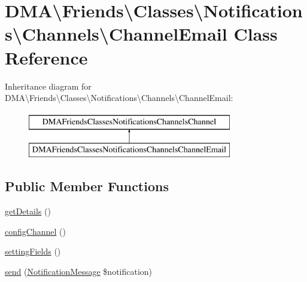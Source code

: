 \hypertarget{classDMA_1_1Friends_1_1Classes_1_1Notifications_1_1Channels_1_1ChannelEmail}{}\section{D\+M\+A\textbackslash{}Friends\textbackslash{}Classes\textbackslash{}Notifications\textbackslash{}Channels\textbackslash{}Channel\+Email Class Reference}
\label{classDMA_1_1Friends_1_1Classes_1_1Notifications_1_1Channels_1_1ChannelEmail}
Inheritance diagram for D\+M\+A\textbackslash{}Friends\textbackslash{}Classes\textbackslash{}Notifications\textbackslash{}Channels\textbackslash{}Channel\+Email\+:\begin{figure}[H]
\begin{center}
\leavevmode
\includegraphics[height=2.000000cm]{dd/d1a/classDMA_1_1Friends_1_1Classes_1_1Notifications_1_1Channels_1_1ChannelEmail}
\end{center}
\end{figure}
\subsection*{Public Member Functions}
\begin{DoxyCompactItemize}
\item 
\hyperlink{classDMA_1_1Friends_1_1Classes_1_1Notifications_1_1Channels_1_1ChannelEmail_a475f4bcecb6f6a68f8938606b75257c5}{get\+Details} ()
\item 
\hyperlink{classDMA_1_1Friends_1_1Classes_1_1Notifications_1_1Channels_1_1ChannelEmail_aa1435fd7c5b6aa3119cbaedf08277275}{config\+Channel} ()
\item 
\hyperlink{classDMA_1_1Friends_1_1Classes_1_1Notifications_1_1Channels_1_1ChannelEmail_a5e2c8c7c67de35cd99f5cdd9b4cc31cd}{setting\+Fields} ()
\item 
\hyperlink{classDMA_1_1Friends_1_1Classes_1_1Notifications_1_1Channels_1_1ChannelEmail_a92161c6ed146cfef431ae1deafd0d751}{send} (\hyperlink{classDMA_1_1Friends_1_1Classes_1_1Notifications_1_1NotificationMessage}{Notification\+Message} \$notification)
\end{DoxyCompactItemize}
